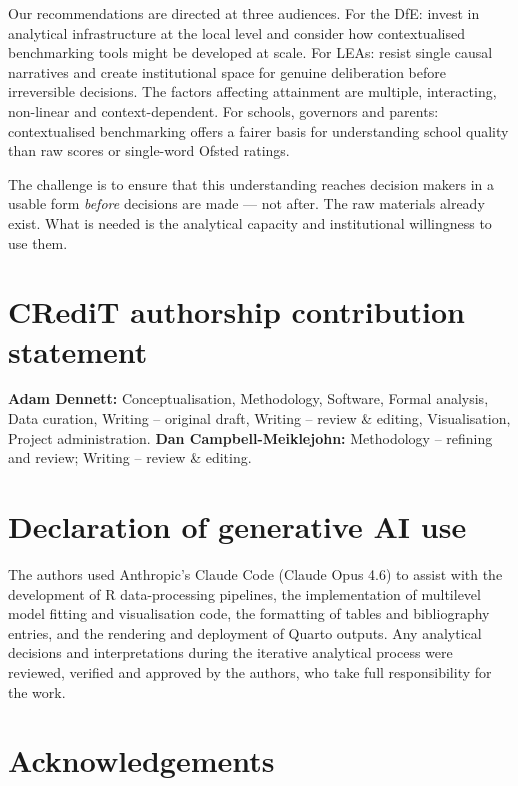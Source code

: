 \documentclass[
  12pt,
  titlepage]{article}
\begin{document}
Our recommendations are directed at three audiences. For the DfE: invest
in analytical infrastructure at the local level and consider how
contextualised benchmarking tools might be developed at scale. For LEAs:
resist single causal narratives and create institutional space for
genuine deliberation before irreversible decisions. The factors
affecting attainment are multiple, interacting, non-linear and
context-dependent. For schools, governors and parents: contextualised
benchmarking offers a fairer basis for understanding school quality than
raw scores or single-word Ofsted ratings.

The challenge is to ensure that this understanding reaches decision
makers in a usable form \emph{before} decisions are made --- not after.
The raw materials already exist. What is needed is the analytical
capacity and institutional willingness to use them.

\section*{CRediT authorship contribution
statement}\label{credit-authorship-contribution-statement}

\textbf{Adam Dennett:} Conceptualisation, Methodology, Software, Formal
analysis, Data curation, Writing -- original draft, Writing -- review \&
editing, Visualisation, Project administration. \textbf{Dan
Campbell-Meiklejohn:} Methodology -- refining and review; Writing --
review \& editing.

\section*{Declaration of generative AI
use}\label{declaration-of-generative-ai-use}

The authors used Anthropic's Claude Code (Claude Opus 4.6) to assist
with the development of R data-processing pipelines, the implementation
of multilevel model fitting and visualisation code, the formatting of
tables and bibliography entries, and the rendering and deployment of
Quarto outputs. Any analytical decisions and interpretations during the
iterative analytical process were reviewed, verified and approved by the
authors, who take full responsibility for the work.

\section*{Acknowledgements}\label{acknowledgements}
\end{document}
